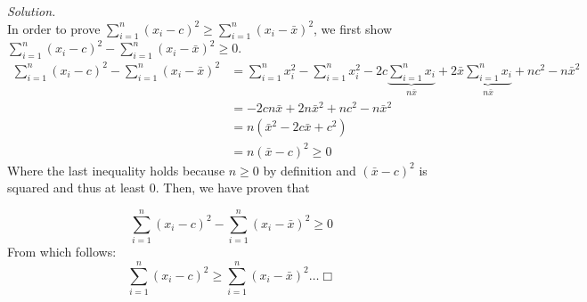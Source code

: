 \documentclass[
]{article}
\begin{document}
\textit{Solution.}\\
In order to prove
\(\sum_{i=1}^n(x_i-c)^2 \ge \sum_{i=1}^n(x_i-\bar{x})^2\), we first show
\(\sum_{i=1}^n(x_i-c)^2 - \sum_{i=1}^n(x_i-\bar{x})^2 \ge 0\).
\[\begin{aligned}
\sum_{i=1}^n(x_i-c)^2 - \sum_{i=1}^n(x_i-\bar{x})^2 &= \sum_{i=1}^nx_i^2 - \sum_{i=1}^nx_i^2 - 2c\underbrace{\sum_{i=1}^nx_i}_{n\bar{x}} + 2\bar{x} \underbrace{\sum_{i=1}^nx_i}_{n\bar{x}} + nc^2 -n\bar{x}^2\\
&= -2cn\bar{x} + 2n\bar{x}^2 + nc^2 - n \bar{x}^2 \\
&= n(\bar{x}^2 -2c\bar{x}+ c^2) \\
&= n(\bar{x} - c)^2 \ge 0
\end{aligned}\] Where the last inequality holds because \(n \ge 0\) by
definition and \((\bar{x} - c)^2\) is squared and thus at least \(0\).
Then, we have proven that

\[\sum_{i=1}^n(x_i-c)^2 - \sum_{i=1}^n(x_i-\bar{x})^2 \ge 0\] From which
follows:
\[\sum_{i=1}^n(x_i-c)^2 \ge \sum_{i=1}^n(x_i-\bar{x})^2 \dots \Box\]
\end{document}
